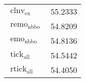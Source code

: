 \begin{tabular}{p{6cm}S}
    $\operatorname{clnv}_{\text{ex}}$                                                                                                                                                                                                & 55.2333    \\
    $\operatorname{remo}_{\text{nbbo}}$                                                                                                                                                                                              & 54.8209    \\
    $\operatorname{emo}_{\text{nbbo}}$                                                                                                                                                                                               & 54.8136    \\
    $\operatorname{tick}_{\text{all}}$                                                                                                                                                                                               & 54.5442    \\
    $\operatorname{rtick}_{\text{all}}$                                                                                                                                                                                              & 54.4050    \\

\end{tabular}
